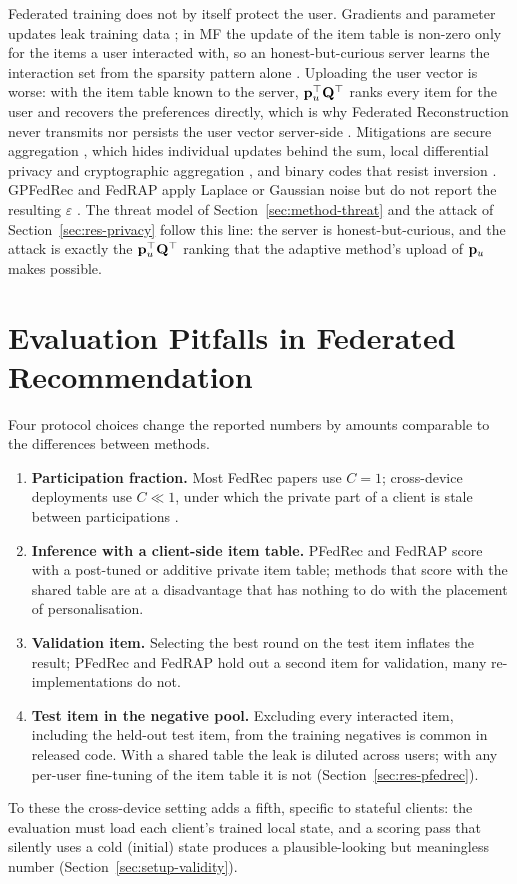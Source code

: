 Federated training does not by itself protect the user. Gradients and parameter updates leak
training data \cite{zhu2019dlg,melis2019exploiting}; in MF the update of the item table is
non-zero only for the items a user interacted with, so an honest-but-curious server learns the
interaction set from the sparsity pattern alone \cite{chai2021fedmf}. Uploading the user vector
is worse: with the item table known to the server, $\mathbf{p}_u^\top\mathbf{Q}^\top$ ranks every item for the
user and recovers the preferences directly, which is why Federated Reconstruction never
transmits nor persists the user vector server-side \cite{singhal2021fedrecon}. Mitigations are
secure aggregation \cite{bonawitz2017secagg}, which hides individual updates behind the sum,
local differential privacy and cryptographic aggregation \cite{hu2025p2fedrec}, and binary codes
that resist inversion \cite{zhang2022lightfr}. GPFedRec and FedRAP apply Laplace or Gaussian
noise but do not report the resulting $\varepsilon$ \cite{zhang2024gpfedrec,li2024fedrap}. The
threat model of Section~\ref{sec:method-threat} and the attack of Section~\ref{sec:res-privacy}
follow this line: the server is honest-but-curious, and the attack is exactly the
$\mathbf{p}_u^\top\mathbf{Q}^\top$ ranking that the adaptive method's upload of $\mathbf{p}_u$ makes possible.

\section{Evaluation Pitfalls in Federated Recommendation}
\label{sec:lit-pitfalls}

Four protocol choices change the reported numbers by amounts comparable to the differences
between methods.
\begin{enumerate}[leftmargin=2em]
  \item \textbf{Participation fraction.} Most FedRec papers use $C=1$; cross-device deployments
        use $C \ll 1$, under which the private part of a client is stale between participations
        \cite{kairouz2021advances}.
  \item \textbf{Inference with a client-side item table.} PFedRec and FedRAP score with a
        post-tuned or additive private item table; methods that score with the shared table are
        at a disadvantage that has nothing to do with the placement of personalisation.
  \item \textbf{Validation item.} Selecting the best round on the test item inflates the result;
        PFedRec and FedRAP hold out a second item for validation, many re-implementations do not.
  \item \textbf{Test item in the negative pool.} Excluding every interacted item, including the
        held-out test item, from the training negatives is common in released code. With a shared
        table the leak is diluted across users; with any per-user fine-tuning of the item table it
        is not (Section~\ref{sec:res-pfedrec}).
\end{enumerate}
To these the cross-device setting adds a fifth, specific to stateful clients: the evaluation
must load each client's trained local state, and a scoring pass that silently uses a cold
(initial) state produces a plausible-looking but meaningless number
(Section~\ref{sec:setup-validity}).

